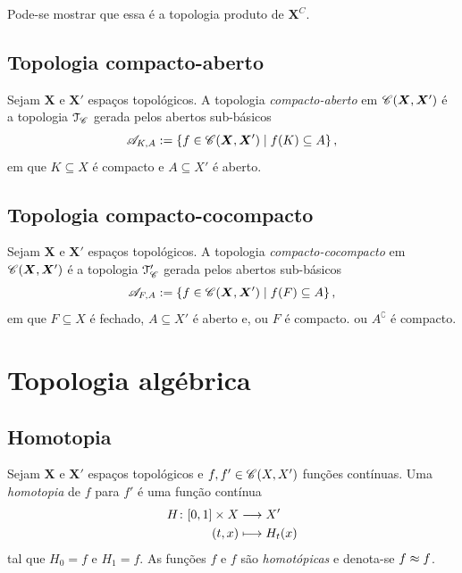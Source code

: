 Pode-se mostrar que essa é a topologia produto de $\bm X^C$.


\subsection{Topologia compacto-aberto}

\begin{definition}
Sejam $\bm X$ e $\bm X'$ espaços topológicos. A topologia \emph{compacto-aberto} em $\mathscr{C}(\bm X,\bm X')$ é a topologia $\mathcal{T}_{\mathscr{C}}$ gerada pelos abertos sub-básicos
	\begin{equation*}
	\mathscr A_{K,A} := \left\{{f \in \mathscr{C}(\bm X,\bm X')}\;\middle\vert\;{f(K) \subseteq A}\right\},
	\end{equation*}
em que $K \subseteq X$ é compacto e $A \subseteq X'$ é aberto.
\end{definition}

\subsection{Topologia compacto-cocompacto}

\begin{definition}
Sejam $\bm X$ e $\bm X'$ espaços topológicos. A topologia \emph{compacto-cocompacto} em $\mathscr{C}(\bm X,\bm X')$ é a topologia $\mathcal{T}'_{\mathscr{C}}$ gerada pelos abertos sub-básicos
	\begin{equation*}
	\mathscr A_{F,A} := \left\{{f \in \mathscr{C}(\bm X,\bm X')}\;\middle\vert\;{f(F) \subseteq A}\right\},
	\end{equation*}
em que $F \subseteq X$ é fechado, $A \subseteq X'$ é aberto e, ou $F$ é compacto. ou $A^\complement$ é compacto.
\end{definition}



\section{Topologia algébrica}

\subsection{Homotopia}

\begin{definition}
Sejam $\bm X$ e $\bm X'$ espaços topológicos e $f,f' \in \mathscr{C}(X,X')$ funções contínuas. Uma \textit{homotopia} de $f$ para $f'$ é uma função contínua
	\begin{align*}
	{H}\colon {\left[{0},{1}\right] \times X} &\longrightarrow {X'} \\{(t,x)} &\longmapsto H_t(x)
	\end{align*}
tal que $H_0 = f$ e $H_1 = f$. As funções $f$ e $f$ são \textit{homotópicas} e denota-se $f \approx f$.
\end{definition}

